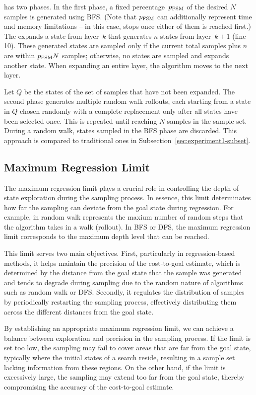 \bfs has two phases. In the first phase, a fixed percentage~$p_\text{FSM}$ of the desired $N$ samples is generated using BFS. (Note that $p_\text{FSM}$ can additionally represent time and memory limitations -- in this case, \bfs stops once either of them is reached first.) The \bfs expands a state from layer~$k$ that generates $n$ states from layer~$k+1$ (line 10). These generated states are sampled only if the current total samples plus $n$ are within $p_{\text{FSM}}N$ samples; otherwise, no states are sampled and \bfs expands another state. When expanding an entire layer, the algorithm moves to the next layer.

Let $Q$ be the states of the set of samples that have not been expanded. The second phase generates multiple random walk rollouts, each starting from a state in $Q$ chosen randomly with a complete replacement only after all states have been selected once. This is repeated until reaching $N$ samples in the sample set. During a random walk, states sampled in the BFS phase are discarded. This approach is compared to traditional ones in Subsection~\ref{sec:experiment1-subset}.

\subsection{Maximum Regression Limit}
\label{sec:rollout-depth-limit}

The maximum regression limit plays a crucial role in controlling the depth of state exploration during the sampling process. In essence, this limit determinates how far the sampling can deviate from the goal state during regression. For example, in random walk represents the maxium number of random steps that the algorithm takes in a walk (rollout). In BFS or DFS, the maximum regression limit corresponds to the maximum depth level that can be reached.

This limit serves two main objectives. First, particularly in regression-based methods, it helps maintain the precision of the cost-to-goal estimate, which is determined by the distance from the goal state that the sample was generated and tends to degrade during sampling due to the random nature of algorithms such as random walk or DFS. Secondly, it regulates the distribution of samples by periodically restarting the sampling process, effectively distributing them across the different distances from the goal state.

By establishing an appropriate maximum regression limit, we can achieve a balance between exploration and precision in the sampling process. If the limit is set too low, the sampling may fail to cover areas that are far from the goal state, typically where the initial states of a search reside, resulting in a sample set lacking information from these regions. On the other hand, if the limit is excessively large, the sampling may extend too far from the goal state, thereby compromising the accuracy of the cost-to-goal estimate.

